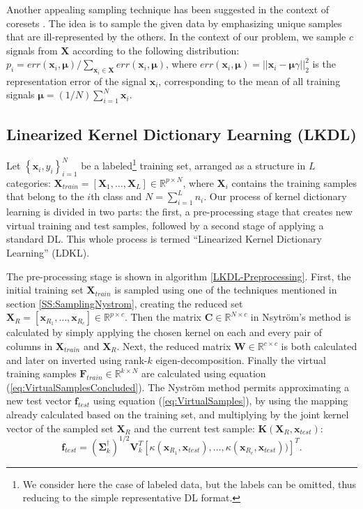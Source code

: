 \documentclass[journal]{IEEEtran}
\newcommand{\bx}{\mathbf{x}}
\newcommand{\bbf}{\mathbf{f}}
\newcommand{\bX}{\mathbf{X}}
\newcommand{\bK}{\mathbf{K}}
\newcommand{\bF}{\mathbf{F}}
\newcommand{\bC}{\mathbf{C}}
\newcommand{\bW}{\mathbf{W}}
\begin{document}
Another appealing sampling technique has been suggested in the context of coresets \cite{coreset}. The idea is to sample the given data by emphasizing unique samples that are ill-represented by the others. In the context of our problem, we sample $c$ signals from $\bX$ according to the following distribution: $p_i = err(\bx_i,\boldsymbol{\mu})/\sum_{\bx_i \in \bX} err(\bx_i,\boldsymbol{\mu})$, where $err(\bx_i,\boldsymbol{\mu})=||\bx_i - \boldsymbol{\mu} \gamma||_2^2$ is the representation error of the signal $\bx_i$, corresponding to the mean of all training signals $\boldsymbol{\mu}=(1/N)\sum_{i=1}^{N} \bx_i$.

\subsection{Linearized Kernel Dictionary Learning (LKDL)} \label{SS:Algorithm}

Let $\left\{\bx_i,y_i\right\}_{i=1}^N$ be a labeled\footnote{We consider here the case of labeled data, but the labels can be omitted, thus reducing to the simple representative DL format.} training set, arranged as a structure in $L$ categories: $\bX_{train}=\left[\bX_1,\ldots,\bX_L\right] \in \mathbb{R}^{p \times N}$, where $\bX_i$ contains the training samples that belong to the $i$th class and $N = \sum \nolimits_{i=1}^{L} n_i$. Our process of kernel dictionary learning is divided in two parts: the first, a pre-processing stage that creates new virtual training and test samples, followed by a second stage of applying a standard DL. This whole process is termed ``Linearized Kernel Dictionary Learning'' (LDKL).

The pre-processing stage is shown in algorithm \ref{LKDL-Preprocessing}. First, the initial training set $\bX_{train}$ is sampled using one of the techniques mentioned in section \ref{SS:SamplingNystrom}, creating the reduced set $\bX_R = [\bx_{R_1},\ldots,\bx_{R_c}] \in \mathbb{R}^{p \times c}$. Then the matrix $\bC \in \mathbb{R}^{N \times c}$ in Nsytr\"{o}m's method is calculated by simply applying the chosen kernel on each and every pair of columns in $\bX_{train}$ and $\bX_R$. Next, the reduced matrix $\bW \in \mathbb{R}^{c \times c}$ is both calculated and later on inverted using rank-$k$ eigen-decomposition.
Finally the virtual training samples $\bF_{train} \in \mathbb{R}^{k \times N}$ are calculated using equation (\ref{eq:VirtualSamplesConcluded}). The Nystr\"{o}m method permits approximating a new test vector $\bbf_{test}$ using equation (\ref{eq:VirtualSamples}), by using the mapping already calculated based on the training set, and multiplying by the joint kernel vector of the sampled set $\bX_R$ and the current test sample: $\bK(\bX_R,\bx_{test})$:
\begin{equation}\label{eq:MappingTest}
    \boldsymbol{f}_{test} = \left(\boldsymbol{\Sigma}_k^{\dagger} \right)^{1/2} \mathbf{V}_k^T \left[\kappa(\bx_{R_1},\bx_{test}),\ldots,\kappa(\bx_{R_c},\bx_{test}))\right]^T.
\end{equation}
\end{document}
